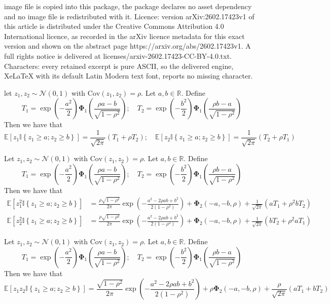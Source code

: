 \documentclass[10pt,a4paper]{amsart}
\newcommand{\indy}[1]{\mathbb{I}\left\{#1\right\}}
\newcommand{\paren}[1]{\left(#1\right)}
\providecommand{\E}{\mathbb{E}}
\providecommand{\R}{\mathbb{R}}
\begin{document}
image file is copied into this package, the package declares no asset dependency and no image file is redistributed with it. Licence: version arXiv:2602.17423v1 of this article is distributed under the Creative Commons Attribution 4.0 International licence, as recorded in the arXiv licence metadata for this exact version and shown on the abstract page https://arxiv.org/abs/2602.17423v1. A full rights notice is delivered at licenses/arxiv-2602.17423-CC-BY-4.0.txt. Characters: every retained excerpt is pure ASCII, so the delivered engine, XeLaTeX with its default Latin Modern text font, reports no missing character.
\begin{lemma}
    \label{lem:first_ord_term_exp}
    let $z_1, z_2\sim\mathcal{N}\paren{0, 1}$ with $\text{Cov}\paren{z_1, z_2} = \rho$. Let $a, b \in\R$. Define
    \[
        T_1 = \exp\paren{-\frac{a^2}{2}}\bm{\Phi}_1\paren{\frac{\rho a - b}{\sqrt{1-\rho^2}}};\quad T_2 = \exp\paren{-\frac{b^2}{2}}\bm{\Phi}_1\paren{\frac{\rho b - a}{\sqrt{1-\rho^2}}}
    \]
    Then we have that
    \[
        \E\left[z_1\indy{z_1\geq a; z_2\geq b}\right] =\frac{1}{\sqrt{2\pi}}\paren{T_1 + \rho T_2};\quad \E\left[z_2\indy{z_1\geq a; z_2\geq b}\right] = \frac{1}{\sqrt{2\pi}}\paren{T_2 + \rho T_1}
    \]
\end{lemma}

\begin{lemma}
    \label{lem:sq_term_exp}
    Let $z_1, z_2\sim\mathcal{N}\paren{0, 1}$ with $\text{Cov}\paren{z_1, z_2} = \rho$. Let $a, b \in\R$. Define
    \[
        T_1 = \exp\paren{-\frac{a^2}{2}}\bm{\Phi}_1\paren{\frac{\rho a - b}{\sqrt{1-\rho^2}}};\quad T_2 = \exp\paren{-\frac{b^2}{2}}\bm{\Phi}_1\paren{\frac{\rho b - a}{\sqrt{1-\rho^2}}}
    \]
    Then we have that
    \begin{align*}
        \E\left[z_1^2\indy{z_1\geq a; z_2\geq b}\right] & = \frac{\rho\sqrt{1-\rho^2}}{2\pi}\exp\paren{-\frac{a^2 - 2\rho ab + b^2}{2\paren{1-\rho^2}}} + \bm{\Phi}_2\paren{-a,-b,\rho} + \frac{1}{\sqrt{2\pi}}\paren{aT_1 + \rho^2 bT_2}\\
        \E\left[z_2^2\indy{z_1\geq a; z_2\geq b}\right] & = \frac{\rho\sqrt{1-\rho^2}}{2\pi}\exp\paren{-\frac{a^2 - 2\rho ab + b^2}{2\paren{1-\rho^2}}} + \bm{\Phi}_2\paren{-a,-b,\rho} + \frac{1}{\sqrt{2\pi}}\paren{bT_2 + \rho^2 aT_1}
    \end{align*}
\end{lemma}

\begin{lemma}
    \label{lem:prod_term_exp}
    Let $z_1, z_2\sim\mathcal{N}\paren{0, 1}$ with $\text{Cov}\paren{z_1, z_2} = \rho$. Let $a, b \in\R$. Define
    \[
        T_1 = \exp\paren{-\frac{a^2}{2}}\bm{\Phi}_1\paren{\frac{\rho a - b}{\sqrt{1-\rho^2}}};\quad T_2 = \exp\paren{-\frac{b^2}{2}}\bm{\Phi}_1\paren{\frac{\rho b - a}{\sqrt{1-\rho^2}}}
    \]
    Then we have that
    \[
        \E\left[z_1z_2\indy{z_1\geq a;z_2\geq b}\right] =  \frac{\sqrt{1-\rho^2}}{2\pi}\exp\paren{-\frac{a^2 - 2\rho ab + b^2}{2\paren{1-\rho^2}}} + \rho\bm{\Phi}_2\paren{-a,-b,\rho} + \frac{\rho}{\sqrt{2\pi}}\paren{aT_1 + bT_2}
    \]
\end{lemma}
\end{document}
